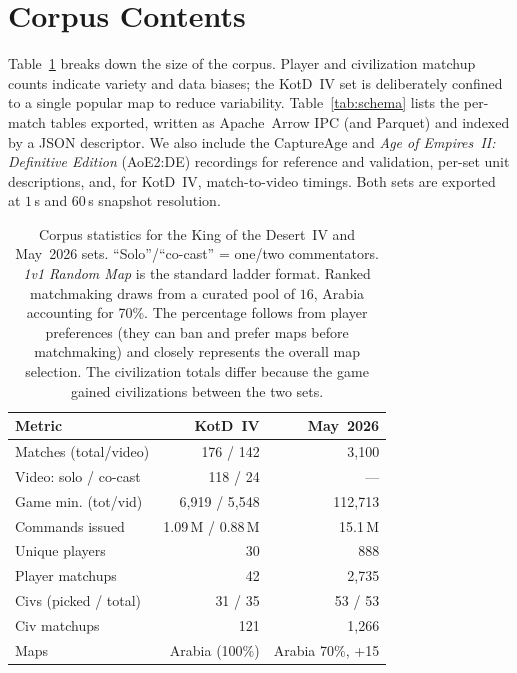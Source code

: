 \documentclass[11pt]{article}
\begin{document}
\section{Corpus Contents}
\label{app:corpus-stats}
Table~\ref{tab:corpus} breaks down the size of the corpus. Player and civilization matchup counts indicate variety and data biases; the KotD~IV set is deliberately confined to a single popular map to reduce variability. Table~\ref{tab:schema} lists the per-match tables exported, written as Apache~Arrow IPC (and Parquet) and indexed by a JSON descriptor. We also include the CaptureAge and \emph{Age of Empires~II: Definitive Edition} (AoE2:DE) recordings for reference and validation, per-set unit descriptions, and, for KotD~IV, match-to-video timings. Both sets are exported at $1$\,s and $60$\,s snapshot resolution.
\begin{table}[!htb]
  \centering\footnotesize
  \setlength{\tabcolsep}{4pt}
  \begin{tabular}{@{}lrr@{}}
    \toprule
    \textbf{Metric}       & \textbf{KotD~IV}  & \textbf{May~2026} \\
    \midrule
    Matches (total/video) & 176 / 142         & 3{,}100 \\
    Video: solo / co-cast & 118 / 24          & --- \\
    Game min. (tot/vid)   & 6{,}919 / 5{,}548 & 112{,}713 \\
    Commands issued       & 1.09\,M / 0.88\,M & 15.1\,M \\
    Unique players        & 30                & 888 \\
    Player matchups       & 42                & 2{,}735 \\
    Civs (picked / total) & 31 / 35           & 53 / 53 \\
    Civ matchups          & 121               & 1{,}266 \\
    Maps                  & Arabia (100\%)    & Arabia 70\%, +15 \\
    \bottomrule
  \end{tabular}
  \caption{Corpus statistics for the King of the Desert~IV and May~2026 sets. ``Solo''/``co-cast'' = one/two commentators. \emph{1v1 Random Map} is the standard ladder format. Ranked matchmaking draws from a curated pool of $16$, Arabia accounting for 70\%. The percentage follows from player preferences (they can ban and prefer maps before matchmaking) and closely represents the overall map selection. The civilization totals differ because the game gained civilizations between the two sets.}
  \label{tab:corpus}
\end{table}
\end{document}
